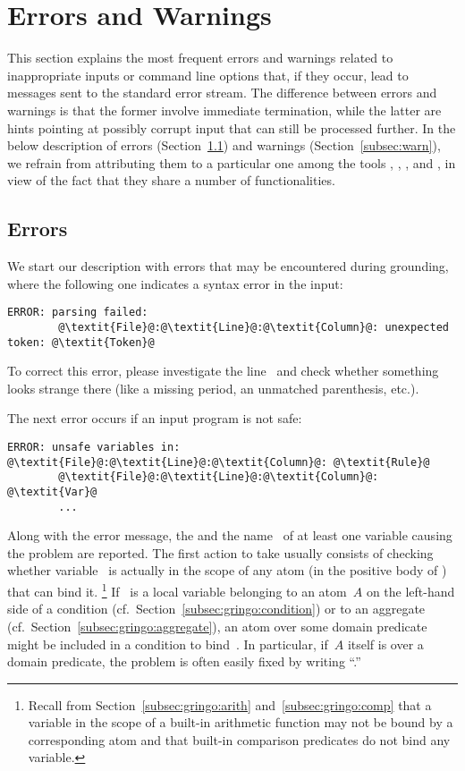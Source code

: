 \section{Errors and Warnings}\label{sec:error:warn}

This section explains the most frequent errors and warnings
related to inappropriate inputs or command line options that,
if they occur, lead to messages sent to the standard error stream.
The difference between errors and warnings is that the former
involve immediate termination,
while the latter are hints pointing at possibly corrupt input
that can still be processed further.
In the below description of errors (Section~\ref{subsec:error})
and warnings (Section~\ref{subsec:warn}),
we refrain from attributing them to a particular one among the tools
\gringo, \clasp, \clingo, and \iclingo,
in view of the fact that they share a number of functionalities.


\subsection{Errors}\label{subsec:error}

We start our description with errors that may be encountered during grounding,
where the following one indicates a syntax error in the input:
%
\begin{lstlisting}[numbers=none,escapechar=@]
ERROR: parsing failed:
        @\textit{File}@:@\textit{Line}@:@\textit{Column}@: unexpected token: @\textit{Token}@
\end{lstlisting}
%
To correct this error, please investigate the line~
and check whether something looks strange there
(like a missing period, an unmatched parenthesis, etc.).

The next error occurs if an input program is not safe:
%
\begin{lstlisting}[numbers=none,escapechar=@]
ERROR: unsafe variables in:
@\textit{File}@:@\textit{Line}@:@\textit{Column}@: @\textit{Rule}@
        @\textit{File}@:@\textit{Line}@:@\textit{Column}@: @\textit{Var}@
        ...
\end{lstlisting}
%
Along with the error message, the  and the
name~ of at least one variable causing the problem
are reported.
The first action to take usually consists of checking whether
variable~ is actually in the scope of any atom
(in the positive body of ) that can bind it.%
\footnote{%
  Recall from Section~\ref{subsec:gringo:arith} and~\ref{subsec:gringo:comp}
  that a variable in the scope of a built-in arithmetic function may not be bound
  by a corresponding atom and that built-in comparison predicates do not bind
  any variable.}
If~ is a local variable belonging to an atom~$A$ 
on the left-hand side of a condition (cf.\ Section~\ref{subsec:gringo:condition})
or to an aggregate (cf.\ Section~\ref{subsec:gringo:aggregate}),
an atom over some domain predicate might be included in a condition
to bind~.
In particular, if~$A$ itself is over a domain predicate,
the problem is often easily fixed by writing ``.''

